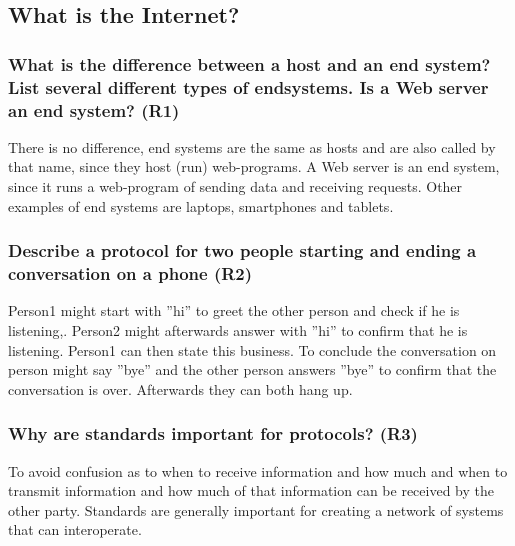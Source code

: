 \subsection{What is the Internet?}
\subsubsection{What is the difference between a host and an end system? List several different types of endsystems. Is a Web server an end system? (R1)}

There is no difference, end systems are the same as hosts and are also called by that name, since they host (run) web-programs. A Web server is an end system, since it runs a web-program of sending data and receiving requests. Other examples of end systems are laptops, smartphones and tablets.

\subsubsection{Describe a protocol for two people starting and ending a conversation on a phone (R2)}

Person1 might start with ''hi'' to greet the other person and check if he is listening,. Person2 might afterwards answer with ''hi'' to confirm that he is listening. Person1 can then state this business. To conclude the conversation on person might say ''bye'' and the other person answers ''bye'' to confirm that the conversation is over. Afterwards they can both hang up.

\subsubsection{Why are standards important for protocols? (R3)}

To avoid confusion as to when to receive information and how much and when to transmit information and how much of that information can be received by the other party. Standards are generally important for creating a network of systems that can interoperate.